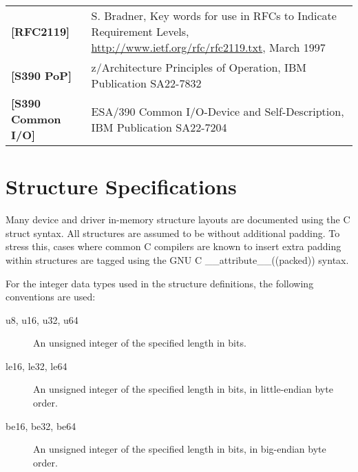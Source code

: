 \begin{longtable}{l p{5in}}
	\label{intro:rfc2119}\textbf{[RFC2119]} & S. Bradner, Key words for use in RFCs to Indicate Requirement Levels, \newline\url{http://www.ietf.org/rfc/rfc2119.txt}, March 1997\\
	\label{intro:S390 PoP}\textbf{[S390 PoP]} & z/Architecture Principles of Operation, \newline IBM Publication SA22-7832\\
	\label{intro:S390 Common I/O}\textbf{[S390 Common I/O]} & ESA/390 Common I/O-Device and Self-Description, \newline IBM Publication SA22-7204\\
\end{longtable}

\section{Structure Specifications}

Many device and driver in-memory structure layouts are documented using
the C struct syntax. All structures are assumed to be without additional
padding. To stress this, cases where common C compilers are known to insert
extra padding within structures are tagged using the GNU C
__attribute__((packed))  syntax.

For the integer data types used in the structure definitions, the following
conventions are used:

\begin{description}
\item[u8, u16, u32, u64] An unsigned integer of the specified length in bits.

\item[le16, le32, le64] An unsigned integer of the specified length in bits,
in little-endian byte order.

\item[be16, be32, be64] An unsigned integer of the specified length in bits,
in big-endian byte order.
\end{description}

\newpage

